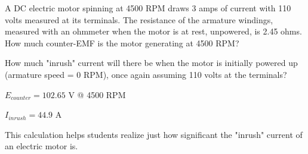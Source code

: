 

A DC electric motor spinning at 4500 RPM draws 3 amps of current with 110 volts measured at its terminals.  The resistance of the armature windings, measured with an ohmmeter when the motor is at rest, unpowered, is 2.45 ohms.  How much counter-EMF is the motor generating at 4500 RPM?

How much "inrush" current will there be when the motor is initially powered up (armature speed = 0 RPM), once again assuming 110 volts at the terminals?







$E_{counter} = 102.65$ V @ 4500 RPM

$I_{inrush} = 44.9$ A







This calculation helps students realize just how significant the "inrush" current of an electric motor is.





